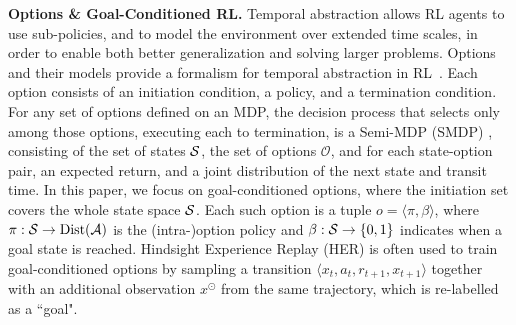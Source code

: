\textbf{Options \& Goal-Conditioned RL.} Temporal abstraction allows RL agents to use sub-policies, and to model the environment over extended time scales, in order to enable both better generalization and solving larger problems. Options and their models provide a formalism for temporal abstraction in RL~\citep{sutton1999between}. Each option consists of an initiation condition, a policy, and a termination condition. For any set of options defined on an MDP, the decision process that selects only among those options, executing each to termination, is a Semi-MDP (SMDP) \citep{puterman2014markov}, consisting of the set of states $\mathcal{S}$,  the set of options $\mathcal{O}$, and for each state-option pair, an expected return, and  a joint distribution of the next state and transit time. In this paper, we focus on goal-conditioned options, where the initiation set covers the whole state space $\mathcal{S}$. Each such option is a tuple $o = \langle \pi, \beta \rangle$, where $\pi: \mathcal{S} \to \text{Dist}(\mathcal{A})$ is the (intra-)option policy and $\beta: \mathcal{S} \to \{0, 1\}$ indicates when a goal state is reached. Hindsight Experience Replay (HER) \citep{andrychowicz2017hindsight} is often used to train goal-conditioned options by sampling a transition $\langle x_t, a_t, r_{t+1}, x_{t+1} \rangle$ together with an additional observation $x^{\odot}$ from the same trajectory, which is re-labelled as a ``goal".



